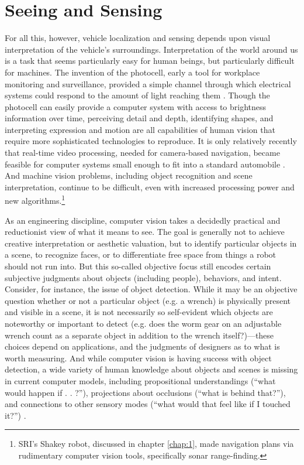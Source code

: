 \section{Seeing and Sensing}

For all this, however, vehicle localization and sensing depends upon
visual interpretation of the vehicle's surroundings. Interpretation of
the world around us is a task that seems
particularly easy for human beings, but particularly difficult for
machines. The invention of the photocell, early a tool for workplace
monitoring and surveillance, provided a simple channel through which
electrical systems could respond to the amount of light reaching
them \cite[p. 44]{faxed} \cite[p. 361]{nyeElectrifying}. Though the photocell can easily
provide a computer system 
with access to brightness information over time, perceiving detail and
depth, identifying shapes, and interpreting expression and motion are
all capabilities of human vision that require more sophisticated
technologies to reproduce. It is only relatively recently that real-time video
processing, needed for camera-based navigation, became feasible for computer
systems small enough to fit into a standard automobile \cite{vamors-p}. And machine
vision problems, including object recognition and scene
interpretation, continue to be difficult, even with increased
processing power and new algorithms.\footnote{SRI's Shakey robot,
  discussed in chapter \ref{chap:1}, made navigation
  plans via rudimentary computer vision tools, specifically sonar range-finding.}

As an engineering discipline, computer vision takes a decidedly
practical and reductionist view of what it means to see. The goal is
generally not to achieve creative interpretation or aesthetic
valuation, but to identify particular objects in a scene, to recognize
faces, or to differentiate free space from things a robot should
not run into. But this so-called objective focus still encodes
certain subjective judgments about objects (including people),
behaviors, and intent. Consider, for instance, the issue of object
detection. While it may be an objective question whether or not a
particular object (e.g. a wrench) is physically present and visible in
a scene, it is not
necessarily so self-evident which objects are noteworthy or important
to detect (e.g. does the worm gear on an adjustable wrench count as a
separate object in addition
to the wrench itself?)---these choices depend on applications, and the judgments of
designers as to what is worth measuring. And while computer vision is having success
with object detection, a wide variety of human knowledge
about objects and scenes is missing in current computer
models, including propositional understandings (``what would happen if
. . ?''), projections about occlusions (``what is behind that?''), and
connections to other sensory modes (``what would that feel like if I
touched it?'') \cite{gomesJordan}.

